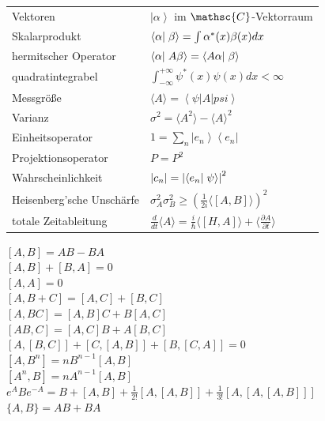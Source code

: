 \documentclass[12pt,a4paper]{article}
\newcommand{\abs}[1]{\left| #1 \right|}
\renewcommand{\d}[2]{\frac{d #1}{d #2}}
\newcommand{\pd}[2]{\frac{\partial #1}{\partial #2}}
\newcommand{\ket}[1]{\left| #1 \right>}
\newcommand{\bra}[1]{\left< #1 \right|}
\newcommand{\braket}[2]{\left< #1 \vphantom{#2} \right|
 \left. #2 \vphantom{#1} \right>}
\renewcommand{\=}[1]{\stackrel{#1}{=}}
\newcommand{\erw}[1]{\langle #1 \rangle}
\theoremstyle{definition}
\theoremstyle{remark}
\begin{document}
\begin{minipage}[t]{.55\linewidth}
\vspace{0pt}
\noindent\begin{tabular}{ll}

Vektoren & $\ket{\alpha}$ im $\mathsc{C}$-Vektorraum\\
Skalarprodukt & $\braket{\alpha}{\beta} = \int \alpha^* (x) \beta(x) dx$\\
hermitscher Operator & $\braket{\alpha}{A \beta} = \braket{A \alpha}{\beta}$\\
quadratintegrabel & $\int_{-\infty}^{+\infty} \psi^*(x) \psi(x) dx < \infty$\\
Messgröße & $\erw{A} = \bra{\psi} A \ket{psi}$\\
Varianz & $\sigma^2 = \erw{A^2} - \erw{A}^2$\\
Einheitsoperator & $\mathcal{1} = \sum_n \ket{e_n}\bra{e_n}$\\
Projektionsoperator & $P = P^2$\\
Wahrscheinlichkeit & $\abs{c_n} = \abs{\braket{e_n}{\psi}}^2$\\
Heisenberg'sche Unschärfe & $\sigma_A^2 \sigma_B^2 \geq (\frac{1}{2i} \erw{[A, B]})^2$\\
totale Zeitableitung & $\d{}{t} \erw{A} = \frac{i}{\hbar} \erw{[H, A]} + \erw{\pd{A}{t}}$\\




\end{tabular}
\end{minipage}%
\begin{minipage}[t]{.45\linewidth}
\vspace{0pt}

\begin{framed}
$[A, B] = AB - BA$\\
$[A, B] + [B, A] = 0$\\
$[A, A] = 0$\\
$[A, B+C] = [A, C] + [B, C]$\\
$[A, BC] = [A, B]C + B[A, C]$\\
$[AB, C] = [A, C]B + A[B, C]$\\
$[A, [B, C]] + [C, [A, B]] + [B, [C, A]] = 0$\\
$[A, B^n] = n B^{n-1}[A, B]$\\
$[A^n, B] = n A^{n-1}[A, B]$\\
$e^A B e^{-A} = B + [A, B] + \frac{1}{2!}[A, [A,B]] + \frac{1}{3!}[A, [A, [A, B]]]$\\
$\{A, B\} = AB + BA$
\end{framed}

\begin{tabular}{ll}


\end{tabular}
\end{minipage}
\end{document}
